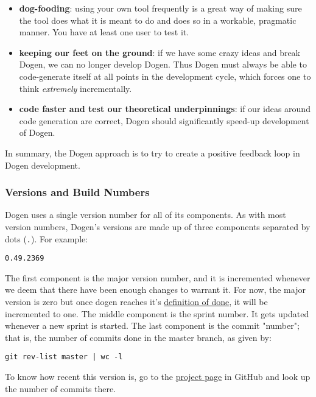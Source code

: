 \documentclass[11pt]{article}
\begin{document}
\begin{itemize}
\item \textbf{dog-fooding}: using your own tool frequently is a great way of making
sure the tool does what it is meant to do and does so in a workable,
pragmatic manner. You have at least one user to test it.
\item \textbf{keeping our feet on the ground}: if we have some crazy ideas and
break Dogen, we can no longer develop Dogen. Thus Dogen must always
be able to code-generate itself at all points in the development
cycle, which forces one to think \emph{extremely} incrementally.
\item \textbf{code faster and test our theoretical underpinnings}: if our ideas
around code generation are correct, Dogen should significantly
speed-up development of Dogen.
\end{itemize}

In summary, the Dogen approach is to try to create a positive feedback
loop in Dogen development.

\subsubsection{Versions and Build Numbers}
\label{sec-2-3-2}

Dogen uses a single version number for all of its components. As with
most version numbers, Dogen's versions are made up of three components
separated by dots (\texttt{.}). For example:

\begin{verbatim}
0.49.2369
\end{verbatim}

The first component is the major version number, and it is incremented
whenever we deem that there have been enough changes to warrant
it. For now, the major version is zero but once dogen reaches it's
\href{https://github.com/DomainDrivenConsulting/dogen/blob/master/doc/agile/definition_of_done.org}{definition of done}, it will be incremented to one. The middle
component is the sprint number. It gets updated whenever a new sprint
is started. The last component is the commit "number"; that is, the
number of commits done in the master branch, as given by:

\begin{verbatim}
git rev-list master | wc -l
\end{verbatim}

To know how recent this version is, go to the \href{https://github.com/DomainDrivenConsulting/dogen}{project page} in GitHub
and look up the number of commits there.
\end{document}
